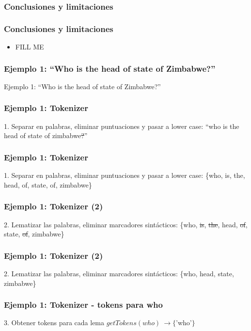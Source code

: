 \subsubsection*{Conclusiones y limitaciones}
\begin{frame}
\frametitle{Conclusiones y limitaciones}
  \begin{itemize}
    \item {\color{red} FILL ME}
  \end{itemize}
\end{frame}

\begin{frame}[t]
\frametitle{Ejemplo 1: ``Who is the head of state of Zimbabwe?''}
Ejemplo 1:\newline
  \Large{``Who is the head of state of Zimbabwe?''}
\end{frame}

\begin{frame}[t]
\frametitle{Ejemplo 1: Tokenizer}
1. Separar en palabras, eliminar puntuaciones y pasar a lower case:\newline
  \Large{``{\color{blue}w}ho is the head of state of {\color{blue}z}imbabwe{\color{red}\st{?}}''}
\end{frame}


\begin{frame}[t]
\frametitle{Ejemplo 1: Tokenizer}
1. Separar en palabras, eliminar puntuaciones y pasar a lower case:\newline
  \Large{\{{\color{blue}w}ho, is, the, head, of, state, of, {\color{blue}z}imbabwe\}}
\end{frame}
\begin{frame}[t]
\frametitle{Ejemplo 1: Tokenizer (2)}
2. Lematizar las palabras, eliminar marcadores sintácticos:\newline
  \Large{\{who, {\color{red}\st{is}}, {\color{red}\st{the}}, head, {\color{red}\st{of}}, state, {\color{red}\st{of}}, zimbabwe\}}
\end{frame}

\begin{frame}[t]
\frametitle{Ejemplo 1: Tokenizer (2)}
2. Lematizar las palabras, eliminar marcadores sintácticos:\newline
  \Large{\{who, head, state, zimbabwe\}}
\end{frame}

\begin{frame}[t]
\frametitle{Ejemplo 1: Tokenizer - tokens para who}
3. Obtener tokens para cada lema \newline
    \Large{$getTokens(who)\ \rightarrow \{$'who'$\}$}
\end{frame}

